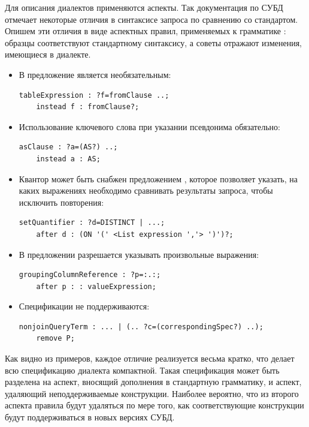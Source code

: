 Для описания диалектов применяются аспекты. Так документация по СУБД  \cite{PostgreSQL} отмечает некоторые отличия в синтаксисе запроса  по сравнению со стандартом. Опишем эти отличия в виде аспектных правил, применяемых к грамматике : образцы соответствуют стандартному синтаксису, а советы отражают изменения, имеющиеся в диалекте.
\begin{itemize}
\item В  предложение  является необязательным:
\begin{lstlisting}
tableExpression : ?f=fromClause ..;
	instead f : fromClause?;
\end{lstlisting}
%
\item Использование ключевого слова  при указании псевдонима обязательно:
\begin{lstlisting}
asClause : ?a=(AS?) ..;
	instead a : AS;
\end{lstlisting}
%
\item Квантор  может быть снабжен предложением , которое позволяет указать, на каких выражениях необходимо сравнивать результаты запроса, чтобы исключить повторения:
\begin{lstlisting}
setQuantifier : ?d=DISTINCT | ...;
	after d : (ON '(' <List expression ','> ')')?;
\end{lstlisting}
%
\item В предложении  разрешается указывать произвольные выражения:
\begin{lstlisting}
groupingColumnReference : ?p=:.:;
	after p : : valueExpression;
\end{lstlisting}
%
\item Спецификации  не поддерживаются:
\begin{lstlisting}
nonjoinQueryTerm : ... | (.. ?c=(correspondingSpec?) ..);
	remove P;
\end{lstlisting}
%
\end{itemize}
Как видно из примеров, каждое отличие реализуется весьма кратко, что делает всю спецификацию диалекта компактной. Такая спецификация может быть разделена на аспект, вносящий дополнения в стандартную грамматику, и аспект, удаляющий неподдерживаемые конструкции. Наиболее вероятно, что из второго аспекта правила будут удаляться по мере того, как соответствующие конструкции будут поддерживаться в новых версиях СУБД.


